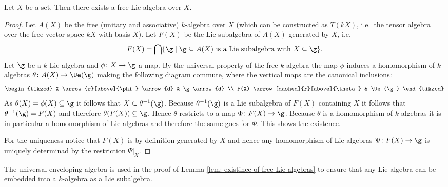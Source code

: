 \begin{lemma}\label{lem: existince of free Lie algebras}
 Let $X$ be a set. Then there exists a free Lie algebra over $X$.
\end{lemma}
\begin{proof}
 Let $A(X)$ be the free (unitary and associative) $k$-algebra over $X$ (which can be constructed as $T(kX)$, i.e.\ the tensor algebra over the free vector space $kX$ with basis $X$). Let $F(X)$ be the Lie subalgebra of $A(X)$ generated by $X$, i.e.
 \[
  F(X) = \bigcap \{\g \mid \text{$\g \subseteq A(X)$ is a Lie subalgebra with $X \subseteq \g$}\}.
 \]
 Let $\g$ be a $k$-Lie algebra and $\phi \colon X \to \g$ a map. By the universal property of the free $k$-algebra the map $\phi$ induces a homomorphism of $k$-algebras $\theta \colon A(X) \to \Ue(\g)$ making the following diagram commute, where the vertical maps are the canonical inclusions:
 \[
   \begin{tikzcd}
     X
     \arrow{r}[above]{\phi}
     \arrow{d}
     &
     \g
     \arrow{d}
     \\
     F(X)
     \arrow[dashed]{r}[above]{\theta}
     &
     \Ue(\g)
   \end{tikzcd}
 \]
 As $\theta(X) = \phi(X) \subseteq \g$ it follows that $X \subseteq \theta^{-1}(\g)$. Because $\theta^{-1}(\g)$ is a Lie subalgebra of $F(X)$ containing $X$ it follows that $\theta^{-1}(\g) = F(X)$ and therefore $\theta(F(X)) \subseteq \g$. Hence $\theta$ restricts to a map $\Phi \colon F(X) \to \g$. Because $\theta$ is a homomorphism of $k$-algebras it is in particular a homomorphism of Lie algebras and therefore the same goes for $\Phi$. This shows the existence.
 
 For the uniqueness notice that $F(X)$ is by definition generated by $X$ and hence any homomorphism of Lie algebras $\Psi \colon F(X) \to \g$ is uniquely determinad by the restriction $\Psi|_X$.
\end{proof}


\begin{remark}
 The universal enveloping algebra is used in the proof of Lemma \ref{lem: existince of free Lie algebras} to ensure that any Lie algebra can be embedded into a $k$-algebra as a Lie subalgebra.
\end{remark}


